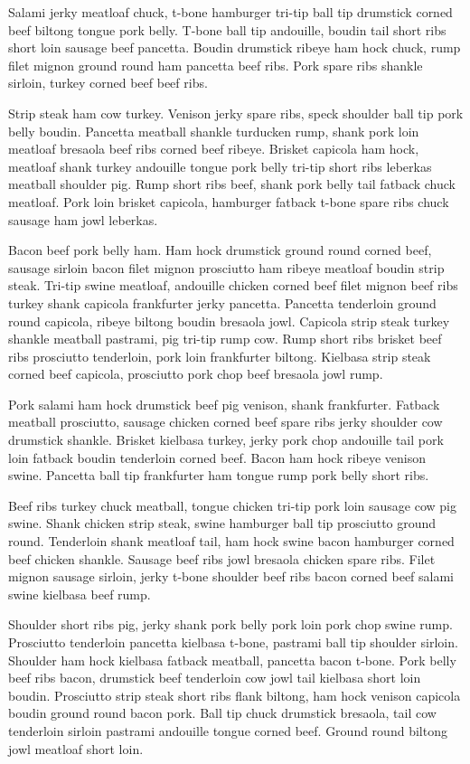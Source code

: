 Salami jerky meatloaf chuck, t-bone hamburger tri-tip ball tip drumstick corned beef biltong tongue pork belly. T-bone ball tip andouille, boudin tail short ribs short loin sausage beef pancetta. Boudin drumstick ribeye ham hock chuck, rump filet mignon ground round ham pancetta beef ribs. Pork spare ribs shankle sirloin, turkey corned beef beef ribs.

Strip steak ham cow turkey. Venison jerky spare ribs, speck shoulder ball tip pork belly boudin. Pancetta meatball shankle turducken rump, shank pork loin meatloaf bresaola beef ribs corned beef ribeye. Brisket capicola ham hock, meatloaf shank turkey andouille tongue pork belly tri-tip short ribs leberkas meatball shoulder pig. Rump short ribs beef, shank pork belly tail fatback chuck meatloaf. Pork loin brisket capicola, hamburger fatback t-bone spare ribs chuck sausage ham jowl leberkas.

Bacon beef pork belly ham. Ham hock drumstick ground round corned beef, sausage sirloin bacon filet mignon prosciutto ham ribeye meatloaf boudin strip steak. Tri-tip swine meatloaf, andouille chicken corned beef filet mignon beef ribs turkey shank capicola frankfurter jerky pancetta. Pancetta tenderloin ground round capicola, ribeye biltong boudin bresaola jowl. Capicola strip steak turkey shankle meatball pastrami, pig tri-tip rump cow. Rump short ribs brisket beef ribs prosciutto tenderloin, pork loin frankfurter biltong. Kielbasa strip steak corned beef capicola, prosciutto pork chop beef bresaola jowl rump.

Pork salami ham hock drumstick beef pig venison, shank frankfurter. Fatback meatball prosciutto, sausage chicken corned beef spare ribs jerky shoulder cow drumstick shankle. Brisket kielbasa turkey, jerky pork chop andouille tail pork loin fatback boudin tenderloin corned beef. Bacon ham hock ribeye venison swine. Pancetta ball tip frankfurter ham tongue rump pork belly short ribs.

Beef ribs turkey chuck meatball, tongue chicken tri-tip pork loin sausage cow pig swine. Shank chicken strip steak, swine hamburger ball tip prosciutto ground round. Tenderloin shank meatloaf tail, ham hock swine bacon hamburger corned beef chicken shankle. Sausage beef ribs jowl bresaola chicken spare ribs. Filet mignon sausage sirloin, jerky t-bone shoulder beef ribs bacon corned beef salami swine kielbasa beef rump.

Shoulder short ribs pig, jerky shank pork belly pork loin pork chop swine rump. Prosciutto tenderloin pancetta kielbasa t-bone, pastrami ball tip shoulder sirloin. Shoulder ham hock kielbasa fatback meatball, pancetta bacon t-bone. Pork belly beef ribs bacon, drumstick beef tenderloin cow jowl tail kielbasa short loin boudin. Prosciutto strip steak short ribs flank biltong, ham hock venison capicola boudin ground round bacon pork. Ball tip chuck drumstick bresaola, tail cow tenderloin sirloin pastrami andouille tongue corned beef. Ground round biltong jowl meatloaf short loin.

